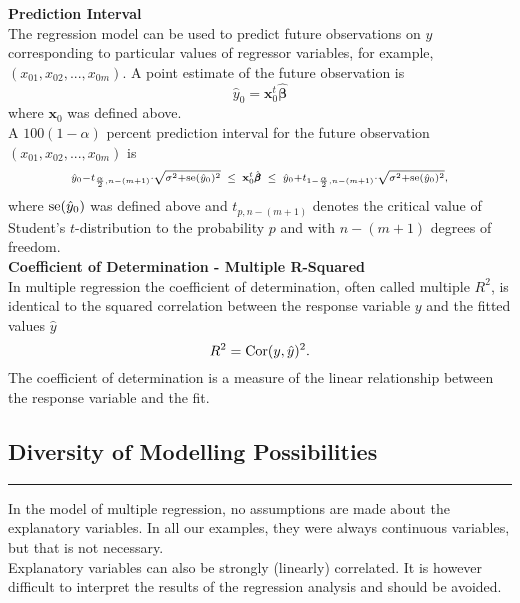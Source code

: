 \textbf{Prediction Interval}\\
The regression model can be used to predict future observations on $y$ corresponding to particular values of regressor variables, for example, $(x_{01}, x_{02}, . . . , x_{0m})$. A point estimate of the future observation is
\begin{equation}
  \hat{y}_0 = \mathbf{x}^t_0 \hat{\pmb{\beta}}
\end{equation}
where $\mathbf{x}_0$ was defined above.\\
A $100(1 - \alpha)$ percent prediction interval for the future observation $(x_{01}, x_{02}, . . . , x_{0m})$ is
\begin{equation} \scriptstyle
  \hat{y}_0 - t_{\frac{\alpha}{2},n-(m+1)} \cdot \sqrt{\sigma^2 + \textup{se}(\hat{y}_0)^2}
  \;\; \leq \;\; \mathbf{x}^t_0 \hat{\pmb{\beta}} \;\; \leq \;\;
  \hat{y}_0 + t_{1-{\frac{\alpha}{2},n-(m+1)}} \cdot \sqrt{\sigma^2 + \textup{se}(\hat{y}_0)^2},
\end{equation}
where $\textup{se}(\hat{y}_0)$ was defined above and $t_{p,n-(m+1)}$ denotes the critical value of Student’s $t$-distribution to the probability $p$ and with $n - (m + 1)$ degrees of freedom.\\

\textbf{Coefficient of Determination - Multiple R-Squared}\\
In multiple regression the coefficient of determination, often called multiple $R^2$, is identical to the squared correlation between the response variable $y$ and the fitted values $\hat{y}$
\begin{equation}
  R^2 = \textup{Cor}(y, \hat{y})^2.
\end{equation}
The coefficient of determination is a measure of the linear relationship between the response variable and the fit.

\subsection{Diversity of Modelling Possibilities}
\noindent\rule[\linienAbstand]{\linewidth}{\linienDicke}
In the model of multiple regression, no assumptions are made about the explanatory variables. In all our examples, they were always continuous variables, but that is not necessary.\\
Explanatory variables can also be strongly (linearly) correlated. It is however difficult to interpret the results of the regression analysis and should be avoided.\\


